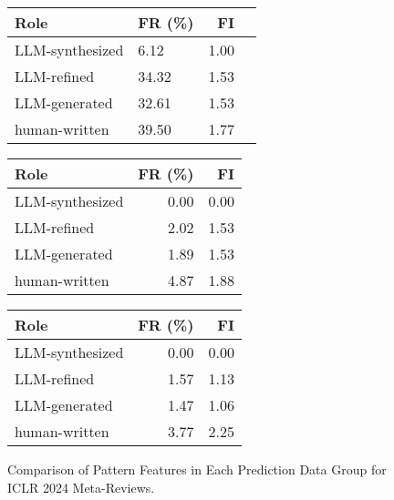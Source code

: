 

\begin{figure}[ht]
    \centering
    \begin{minipage}{1\linewidth}
        \centering
        \begin{tabular}{l|l|r|r}
        \toprule
\textbf{Role} &\textbf{FR (\%)}&\textbf{FI}\\
        \midrule

LLM-synthesized&6.12&1.00\\
LLM-refined&34.32&1.53\\
LLM-generated&32.61&1.53\\
human-written &39.50&1.77\\
        \bottomrule
    \end{tabular}
    \end{minipage}
    \hfill
    \begin{minipage}{1\linewidth}
        \centering
        \begin{tabular}{l|r|r}
        \toprule
\textbf{Role} & \textbf{FR (\%)}&\textbf{FI}\\
        \midrule

LLM-synthesized &0.00&0.00\\
LLM-refined &2.02 &1.53\\
LLM-generated &1.89 &1.53\\
human-written &4.87 &1.88\\
        \bottomrule
    \end{tabular}
    \end{minipage}
    \hfill
    \begin{minipage}{1\linewidth}
        \centering
        \begin{tabular}{l|r|r}
        \toprule
        \textbf{Role} & \textbf{FR (\%)}&\textbf{FI}\\
        \midrule
            LLM-synthesized &0.00&0.00\\
            LLM-refined &1.57&1.13\\
            LLM-generated &1.47&1.06\\
            human-written &3.77&2.25\\
        \bottomrule
    \end{tabular}
    \end{minipage}
    \hfill

    \caption{Comparison of Pattern Features in Each Prediction Data Group for ICLR 2024 Meta-Reviews.}
    \label{tab:pattern_vali}
\end{figure}